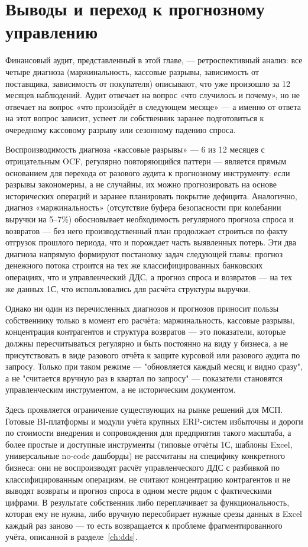\section{Выводы и переход к прогнозному управлению}

Финансовый аудит, представленный в этой главе, --- ретроспективный анализ: все четыре диагноза (маржинальность, кассовые разрывы, зависимость от поставщика, зависимость от покупателя) описывают, что уже произошло за 12 месяцев наблюдений. Аудит отвечает на вопрос «что случилось и почему», но не отвечает на вопрос «что произойдёт в следующем месяце» --- а именно от ответа на этот вопрос зависит, успеет ли собственник заранее подготовиться к очередному кассовому разрыву или сезонному падению спроса.

Воспроизводимость диагноза «кассовые разрывы» --- 6 из 12 месяцев с отрицательным OCF, регулярно повторяющийся паттерн --- является прямым основанием для перехода от разового аудита к прогнозному инструменту: если разрывы закономерны, а не случайны, их можно прогнозировать на основе исторических операций и заранее планировать покрытие дефицита. Аналогично, диагноз «маржинальность» (отсутствие буфера безопасности при колебании выручки на 5--7\%) обосновывает необходимость регулярного прогноза спроса и возвратов --- без него производственный план продолжает строиться по факту отгрузок прошлого периода, что и порождает часть выявленных потерь. Эти два диагноза напрямую формируют постановку задач следующей главы: прогноз денежного потока строится на тех же классифицированных банковских операциях, что и управленческий ДДС, а прогноз спроса и возвратов --- на тех же данных 1С, что использовались для расчёта структуры выручки.

Однако ни один из перечисленных диагнозов и прогнозов приносит пользы собственнику только в момент его расчёта: маржинальность, кассовые разрывы, концентрация контрагентов и структура возвратов --- это показатели, которые должны пересчитываться регулярно и быть постоянно на виду у бизнеса, а не присутствовать в виде разового отчёта к защите курсовой или разового аудита по запросу. Только при таком режиме --- "обновляется каждый месяц и видно сразу", а не "считается вручную раз в квартал по запросу" --- показатели становятся управленческим инструментом, а не историческим документом.

Здесь проявляется ограничение существующих на рынке решений для МСП. Готовые BI-платформы и модули учёта крупных ERP-систем избыточны и дороги по стоимости внедрения и сопровождения для предприятия такого масштаба, а более простые и доступные инструменты (типовые отчёты 1С, шаблоны Excel, универсальные no-code дашборды) не рассчитаны на специфику конкретного бизнеса: они не воспроизводят расчёт управленческого ДДС с разбивкой по классифицированным операциям, не считают концентрацию контрагентов и не выводят возвраты и прогноз спроса в одном месте рядом с фактическими цифрами. В результате собственник либо переплачивает за функциональность, которая ему не нужна, либо вручную пересобирает нужные срезы данных в Excel каждый раз заново --- то есть возвращается к проблеме фрагментированного учёта, описанной в разделе~\ref{ch:dds}.

